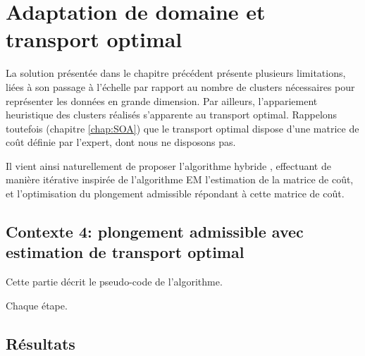 \chapter{Adaptation de domaine et transport optimal}
\label{chap:tranche2}

La solution présentée dans le chapitre précédent présente plusieurs limitations, liées à son passage à l'échelle par rapport au nombre de clusters nécessaires pour représenter les données en grande dimension. Par ailleurs, l'appariement heuristique des clusters réalisés s'apparente au transport optimal. Rappelons toutefois (chapitre \ref{chap:SOA}) que le transport optimal dispose d'une matrice de coût définie par l'expert, dont nous ne disposons pas. 

Il vient ainsi naturellement de proposer l'algorithme hybride \XX, effectuant de manière itérative inspirée de l'algorithme EM \cite{EM} l'estimation de la matrice de coût, et l'optimisation du plongement admissible répondant à cette matrice de coût.

\section{Contexte 4: plongement admissible avec estimation de transport optimal}

Cette partie décrit le pseudo-code de l'algorithme.

\TODO Chaque étape.

\section{Résultats}


